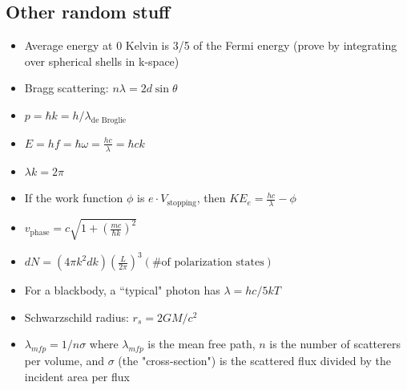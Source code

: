 \documentclass[12pt]{article}
\begin{document}
\subsection{Other random stuff}
\begin{itemize}
    \item Average energy at 0 Kelvin is 3/5 of the Fermi energy (prove by integrating over spherical shells in k-space)
    \item Bragg scattering: $n \lambda = 2 d \sin \theta$
    \item $p=\hbar k= h/\lambda_\text{de Broglie}$
    \item $E = h f = \hbar \omega = \frac{h c}{\lambda} = \hbar c k$
    \item $\lambda k = 2 \pi$
    \item If the work function $\phi$ is $e \cdot V_\text{stopping}$, then $KE_e = \frac{hc}{\lambda} - \phi$
    \item $v_\text{phase} = c \sqrt{1 + \left( \frac{mc}{\hbar k}  \right)^2}$
    \item $dN = (4 \pi k^2 dk) \left( \frac{L}{2 \pi} \right)^3 (\text{\# of polarization states})$
    \item For a blackbody, a ``typical" photon has $\lambda = hc/5kT$
    \item Schwarzschild radius: $r_s = 2GM/c^2$
    \item $\lambda_{mfp} = 1/n \sigma$ where $\lambda_{mfp}$ is the mean free path, $n$ is the number of scatterers per volume, and $\sigma$ (the "cross-section") is the scattered flux divided by the incident area per flux
\end{itemize}
\end{document}
